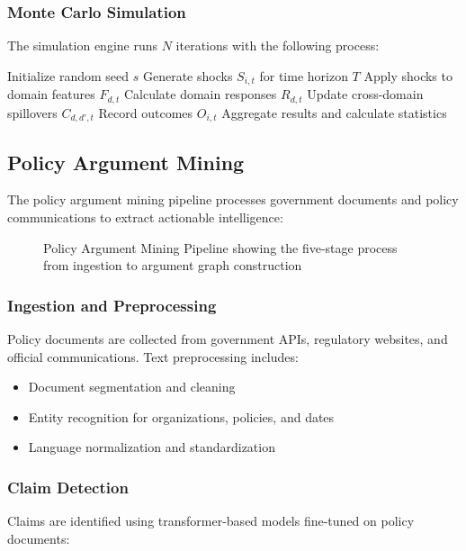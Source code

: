 \subsubsection{Monte Carlo Simulation}
The simulation engine runs $N$ iterations with the following process:

\begin{algorithmic}
\STATE Initialize random seed $s$
    \STATE Generate shocks $S_{i,t}$ for time horizon $T$
    \STATE Apply shocks to domain features $F_{d,t}$
    \STATE Calculate domain responses $R_{d,t}$
    \STATE Update cross-domain spillovers $C_{d,d',t}$
    \STATE Record outcomes $O_{i,t}$
\ENDFOR
\STATE Aggregate results and calculate statistics
\end{algorithmic}

\subsection{Policy Argument Mining}

The policy argument mining pipeline processes government documents and policy communications to extract actionable intelligence:

\begin{figure}[H]
\centering
{}
\caption{Policy Argument Mining Pipeline showing the five-stage process from ingestion to argument graph construction}
\label{fig:argument_pipeline}
\end{figure}

\subsubsection{Ingestion and Preprocessing}
Policy documents are collected from government APIs, regulatory websites, and official communications. Text preprocessing includes:
\begin{itemize}
    \item Document segmentation and cleaning
    \item Entity recognition for organizations, policies, and dates
    \item Language normalization and standardization
\end{itemize}

\subsubsection{Claim Detection}
Claims are identified using transformer-based models fine-tuned on policy documents:

